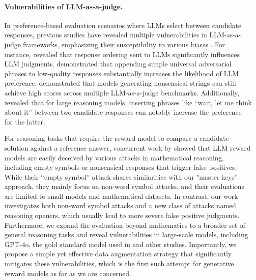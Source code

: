\paragraph{Vulnerabilities of LLM-as-a-judge.} 
In preference-based evaluation scenarios where LLMs select between candidate responses, previous studies have revealed multiple vulnerabilities in LLM-as-a-judge frameworks, emphasizing their susceptibility to various biases \citep{wang2023large, ye2024justice, raina2024llm, zheng2024cheating, chen2024humans, huang2025trustworthiness, thakur2024judging, chen2025llm, li2025preference, wang2025assessing}. For instance, \cite{wang2023large} revealed that response ordering sent to LLMs significantly influences LLM judgments. \cite{raina2024llm} demonstrated that appending simple universal adversarial phrases to low-quality responses substantially increases the likelihood of LLM preference. \cite{zheng2024cheating} demonstrated that models generating nonsensical strings can still achieve high scores across multiple LLM-as-a-judge benchmarks. Additionally, \cite{wang2025assessing} revealed that for large reasoning models, inserting phrases like “wait, let me think about it” between two candidate responses can notably increase the preference for the latter.

For reasoning tasks that require the reward model to compare a candidate solution against a reference answer, concurrent work by \cite{huang2025pitfalls} showed that LLM reward models are easily deceived by various attacks in mathematical reasoning, including empty symbols or nonsensical responses that trigger false positives. While their ``empty symbol'' attack shares similarities with our "master keys" approach, they mainly focus on non-word symbol attacks, and their evaluations are limited to small models and mathematical datasets. In contrast, our work investigates both non-word symbol attacks and a new class of attacks named reasoning openers, which usually lead to more severe false positive judgments. Furthermore, we expand the evaluation beyond mathematics to a broader set of general reasoning tasks and reveal vulnerabilities in large-scale models, including GPT-4o, the gold standard model used in \cite{huang2025pitfalls} and other studies. 
Importantly, we propose a simple yet effective data augmentation strategy that significantly mitigates these vulnerabilities, which is the first such attempt for generative reward models as far as we are concerned.





